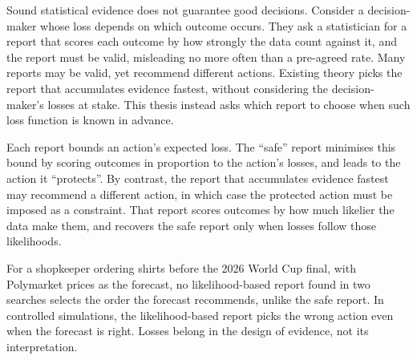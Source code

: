 Sound statistical evidence does not guarantee good decisions. Consider a
decision-maker whose loss depends on which outcome occurs. They ask a
statistician for a report that scores each outcome by how strongly the data
count against it, and the report must be valid, misleading no more often than
a pre-agreed rate. Many reports may be valid, yet recommend different actions.
Existing theory picks the report that accumulates evidence fastest, without
considering the decision-maker's losses at stake. This thesis instead asks which report to
choose when such loss function is known in advance.

Each report bounds an action's expected loss. The ``safe'' report minimises
this bound by scoring outcomes in proportion to the action's losses, and
leads to the action it ``protects''. By contrast, the report that
accumulates evidence fastest may recommend a different action, in which case
the protected action must be imposed as a constraint. That report scores
outcomes by how much likelier the data make them, and recovers the safe report
only when losses follow those likelihoods.

For a shopkeeper ordering shirts before the 2026 World Cup final, with
Polymarket prices as the forecast, no likelihood-based report found in two
searches selects the order the forecast recommends, unlike the safe report. In
controlled simulations, the likelihood-based report picks the wrong action
even when the forecast is right. Losses belong in the design of evidence, not
its interpretation.
